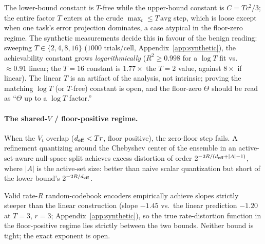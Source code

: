 \begin{remark}
\label{rem:tgap}
The lower-bound constant is $T$-free while the upper-bound constant is
$C = Tc^2/3$; the entire factor $T$ enters at the crude
$\max_t \leq T\,\mathrm{avg}$ step, which is loose except when one
task's error projection dominates, a case atypical in the floor-zero
regime. The synthetic measurements decide this in favour of the benign
reading: sweeping $T \in \{2,4,8,16\}$ ($1000$ trials/cell,
Appendix~\ref{app:synthetic}), the achievability constant grows
\emph{logarithmically} ($R^2 \geq 0.998$ for a $\log T$ fit vs.\
$\approx 0.91$ linear; the $T{=}16$ constant is $1.77\times$ the
$T{=}2$ value, against $8\times$ if linear). The linear $T$ is an
artifact of the analysis, not intrinsic; proving the matching $\log T$
(or $T$-free) constant is open, and the floor-zero $\Theta$ should be
read as ``$\Theta$ up to a $\log T$ factor.''
\end{remark}

\paragraph{The shared-$V$ / floor-positive regime.}\label{subsec:sharedv}
When the $V_t$ overlap ($d_{\mathrm{eff}} < Tr$, floor positive), the zero-floor
step fails. A refinement quantizing around the Chebyshev center of the
ensemble in an active-set-aware null-space split achieves excess
distortion of order $2^{-2R/(d_{\mathrm{eff}} + |A| - 1)}$, where $|A|$ is the
active-set size: better than naive scalar quantization but short of
the lower bound's $2^{-2R/d_{\mathrm{eff}}}$.

\begin{remark}\label{rem:sharedv-gap}
Valid rate-$R$ random-codebook encoders empirically achieve slopes
strictly steeper than the linear construction (slope $-1.45$ vs.\ the
linear prediction $-1.20$ at $T = 3$, $r = 3$;
Appendix~\ref{app:synthetic}), so the true rate-distortion function in
the floor-positive regime lies strictly between the two bounds. Neither
bound is tight; the exact exponent is open.
\end{remark}
